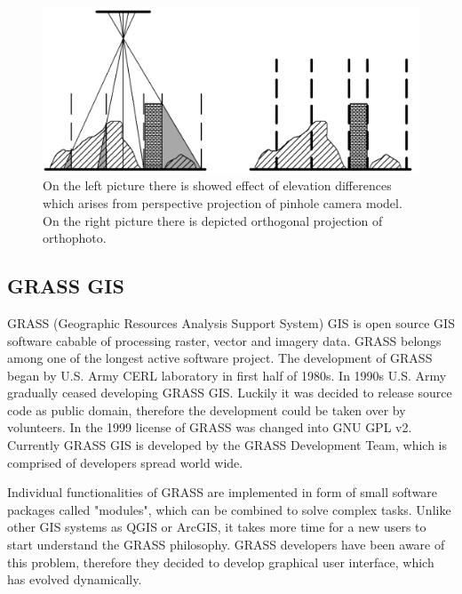 \documentclass[a4paper,12pt]{article}
\begin{document}

\begin{figure}[h]
    \centering
    \includegraphics[scale=0.2]{figures/orthophoto.png}
    \caption{On the left picture there is showed effect of elevation differences 
    which arises from perspective projection of pinhole camera model. 
    On the right picture there is depicted orthogonal projection of orthophoto.}
    \label{fig:ortho}
\end{figure}


\subsection{GRASS GIS}


GRASS (Geographic Resources Analysis Support System) GIS is open source GIS software cabable of processing raster, vector and imagery data. 
GRASS belongs among one of 
the longest active software project. The development of GRASS began by U.S. Army CERL  laboratory
in first half of 1980s. In 1990s U.S. Army gradually ceased developing GRASS GIS. Luckily it was decided to 
release source code as public domain, therefore the development could be taken over by volunteers. In the 1999 license 
of GRASS was changed into GNU GPL v2. Currently GRASS GIS is developed by the GRASS Development 
Team, which is comprised of developers spread world wide. 



Individual functionalities of GRASS are implemented in form of small software packages called "modules", which 
can be combined to solve complex tasks.
Unlike other GIS systems as QGIS or ArcGIS, it takes 
more time for a new users to start understand the GRASS philosophy. GRASS developers 
have been aware of this problem, therefore they decided to develop graphical user interface, which 
has evolved dynamically.
\end{document}
